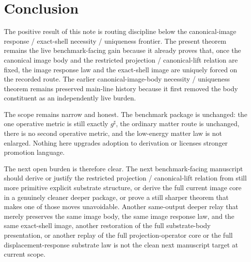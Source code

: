 \documentclass[11pt]{article}
\newcommand{\CompletedMetric}{g^{\sharp}}
\begin{document}
\section{Conclusion}

The positive result of this note is routing discipline below the canonical-image response / exact-shell necessity / uniqueness frontier. The present theorem remains the live benchmark-facing gain because it already proves that, once the canonical image body and the restricted projection / canonical-lift relation are fixed, the image response law and the exact-shell image are uniquely forced on the recorded route. The earlier canonical-image-body necessity / uniqueness theorem remains preserved main-line history because it first removed the body constituent as an independently live burden.

The scope remains narrow and honest. The benchmark package is unchanged: the one operative metric is still exactly \(\CompletedMetric\), the ordinary matter route is unchanged, there is no second operative metric, and the low-energy matter law is not enlarged. Nothing here upgrades adoption to derivation or licenses stronger promotion language.

The next open burden is therefore clear. The next benchmark-facing manuscript should derive or justify the restricted projection / canonical-lift relation from still more primitive explicit substrate structure, or derive the full current image core in a genuinely cleaner deeper package, or prove a still sharper theorem that makes one of those moves unavoidable. Another same-output deeper relay that merely preserves the same image body, the same image response law, and the same exact-shell image, another restoration of the full substrate-body presentation, or another replay of the full projection-operator core or the full displacement-response substrate law is not the clean next manuscript target at current scope.
\end{document}
